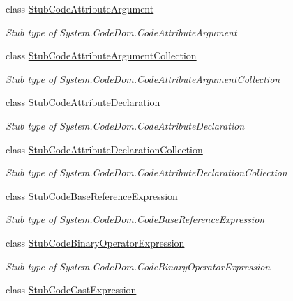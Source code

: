 \begin{DoxyCompactItemize}
class \hyperlink{class_system_1_1_code_dom_1_1_fakes_1_1_stub_code_attribute_argument}{Stub\-Code\-Attribute\-Argument}
\begin{DoxyCompactList}\small\item\em Stub type of System.\-Code\-Dom.\-Code\-Attribute\-Argument\end{DoxyCompactList}\item 
class \hyperlink{class_system_1_1_code_dom_1_1_fakes_1_1_stub_code_attribute_argument_collection}{Stub\-Code\-Attribute\-Argument\-Collection}
\begin{DoxyCompactList}\small\item\em Stub type of System.\-Code\-Dom.\-Code\-Attribute\-Argument\-Collection\end{DoxyCompactList}\item 
class \hyperlink{class_system_1_1_code_dom_1_1_fakes_1_1_stub_code_attribute_declaration}{Stub\-Code\-Attribute\-Declaration}
\begin{DoxyCompactList}\small\item\em Stub type of System.\-Code\-Dom.\-Code\-Attribute\-Declaration\end{DoxyCompactList}\item 
class \hyperlink{class_system_1_1_code_dom_1_1_fakes_1_1_stub_code_attribute_declaration_collection}{Stub\-Code\-Attribute\-Declaration\-Collection}
\begin{DoxyCompactList}\small\item\em Stub type of System.\-Code\-Dom.\-Code\-Attribute\-Declaration\-Collection\end{DoxyCompactList}\item 
class \hyperlink{class_system_1_1_code_dom_1_1_fakes_1_1_stub_code_base_reference_expression}{Stub\-Code\-Base\-Reference\-Expression}
\begin{DoxyCompactList}\small\item\em Stub type of System.\-Code\-Dom.\-Code\-Base\-Reference\-Expression\end{DoxyCompactList}\item 
class \hyperlink{class_system_1_1_code_dom_1_1_fakes_1_1_stub_code_binary_operator_expression}{Stub\-Code\-Binary\-Operator\-Expression}
\begin{DoxyCompactList}\small\item\em Stub type of System.\-Code\-Dom.\-Code\-Binary\-Operator\-Expression\end{DoxyCompactList}\item 
class \hyperlink{class_system_1_1_code_dom_1_1_fakes_1_1_stub_code_cast_expression}{Stub\-Code\-Cast\-Expression}

\end{DoxyCompactItemize}
